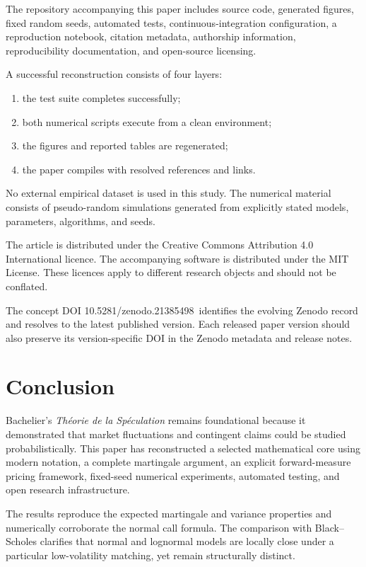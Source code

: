 \documentclass[11pt,a4paper]{article}
\newcommand{\ConceptDOI}{10.5281/zenodo.21385498}
\begin{document}
The repository accompanying this paper includes source code, generated figures, fixed random seeds, automated tests, continuous-integration configuration, a reproduction notebook, citation metadata, authorship information, reproducibility documentation, and open-source licensing.

A successful reconstruction consists of four layers:

\begin{enumerate}[label=(\arabic*), leftmargin=2.2em]
\item the test suite completes successfully;
\item both numerical scripts execute from a clean environment;
\item the figures and reported tables are regenerated;
\item the paper compiles with resolved references and links.
\end{enumerate}

No external empirical dataset is used in this study. The numerical material consists of pseudo-random simulations generated from explicitly stated models, parameters, algorithms, and seeds.

The article is distributed under the Creative Commons Attribution 4.0 International licence. The accompanying software is distributed under the MIT License. These licences apply to different research objects and should not be conflated.

The concept DOI \ConceptDOI\ identifies the evolving Zenodo record and resolves to the latest published version. Each released paper version should also preserve its version-specific DOI in the Zenodo metadata and release notes.

\section{Conclusion}

Bachelier's \emph{Th\'eorie de la Sp\'eculation} remains foundational because it demonstrated that market fluctuations and contingent claims could be studied probabilistically. This paper has reconstructed a selected mathematical core using modern notation, a complete martingale argument, an explicit forward-measure pricing framework, fixed-seed numerical experiments, automated testing, and open research infrastructure.

The results reproduce the expected martingale and variance properties and numerically corroborate the normal call formula. The comparison with Black--Scholes clarifies that normal and lognormal models are locally close under a particular low-volatility matching, yet remain structurally distinct.
\end{document}
